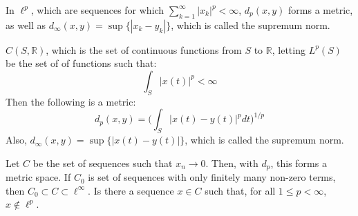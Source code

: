 \documentclass[crop=false,class=article,oneside]{standalone}
\begin{document}
            \begin{example}
                In $\ell^{p}$, which are sequences for
                which
                $\sum_{k=1}^{\infty}|x_{k}|^{p}<\infty$,
                $d_{p}(x,y)$ forms a metric, as well
                as
                $d_{\infty}(x,y)=\sup\{|x_{k}-y_{k}|\}$,
                which is called the supremum norm.
            \end{example}
            \begin{example}
                $C(S,\mathbb{R})$, which is the
                set of continuous functions from
                $S$ to $\mathbb{R}$, letting
                $L^{p}(S)$ be the set of of functions
                such that:
                \begin{equation*}
                    \int_{S}|x(t)|^{p}<\infty
                \end{equation*}
                Then the following is a metric:
                \begin{equation*}
                    d_{p}(x,y)=
                    \bigg(
                        \int_{S}|x(t)-y(t)|^{p}dt
                    \bigg)^{1/p}
                \end{equation*}
                Also,
                $d_{\infty}(x,y)=\sup\{|x(t)-y(t)|\}$,
                which is called the supremum norm.
            \end{example}
            \begin{example}
                Let $C$ be the set of sequences such that
                $x_{n}\rightarrow{0}$. Then, with
                $d_{p}$, this forms a metric space.
                If $C_{0}$ is set of sequences with
                only finitely many non-zero terms,
                then
                $C_{0}\subset{C}\subset{\ell^{\infty}}$.
                Is there a sequence $x\in{C}$ such
                that, for all $1\leq{p}<\infty$,
                $x\notin{\ell^{p}}$.
            \end{example}
\end{document}
